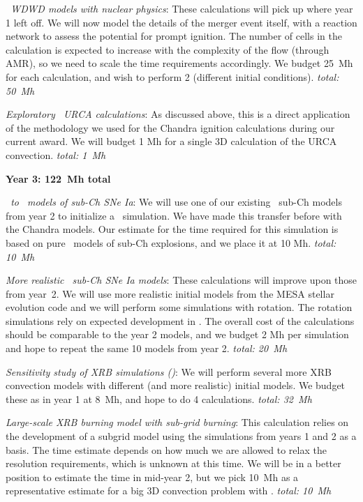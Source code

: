 \begin{tightitem}
\begin{tightitem}
\item {\em \castro\ WDWD models with nuclear physics}:
  These calculations will pick up where year 1 left off.  We will now 
  model the details of the merger event itself, with a reaction network
  to assess the potential for prompt ignition.  The number of cells 
  in the calculation is expected to increase with the complexity of 
  the flow (through AMR), so we need to scale the time requirements
  accordingly.  We budget 25~Mh for each calculation, and wish to 
  perform 2 (different initial conditions). {\em total: 50~Mh}

\item {\em Exploratory \maestro\ URCA calculations}:  As discussed
  above, this is a direct application of the methodology we used
  for the Chandra ignition calculations during our current award.
  We will budget 1 Mh for a single 3D calculation of the URCA
  convection.  {\em total: 1~Mh}
\end{tightitem}
%
\item {\bf Year 3: 122~Mh total}
%
\begin{tightitem}
\item {\em \maestro\ to \castro\ models of sub-Ch SNe Ia}: 
   We will use one of our existing \maestro\ sub-Ch models from year 2
   to initialize a \castro\ simulation.  We have made this
   transfer before with the Chandra models.  Our estimate for
   the time required for this simulation is based on pure \castro\
   models of sub-Ch explosions, and we place it at 10 Mh.  {\em total: 10~Mh}

\item {\em More realistic \maestro\ sub-Ch SNe Ia models}: These
  calculations will improve upon those from year~2.  We will use more
  realistic initial models from the MESA stellar evolution code and we
  will perform some simulations with rotation.  The rotation
  simulations rely on expected development in \maestro.  The overall
  cost of the calculations should be comparable to the year 2 models,
  and we budget 2 Mh per simulation and hope to repeat the same 10
  models from year 2.  {\em total: 20~Mh}

\item {\em Sensitivity study of XRB simulations (\maestro)}:
   We will perform several more XRB convection models with different
   (and more realistic) initial models.  We budget these as in year 1
   at 8~Mh, and hope to do 4 calculations.  {\em total: 32~Mh}
   
\item {\em Large-scale XRB burning model with sub-grid burning}:
  This calculation relies on the development of a subgrid model
  using the simulations from years 1 and 2 as a basis.  The time estimate
  depends on how much we are allowed to relax the resolution requirements,
  which is unknown at this time.  We will be in a better position to
  estimate the time in mid-year 2, but we pick 10~Mh as a representative
  estimate for a big 3D convection problem with \maestro.  {\em total: 10~Mh}


\end{tightitem}
\end{tightitem}
